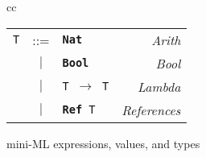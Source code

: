 \begin{figure}[t]
\begin{minipage}{\columnwidth}
\begin{tabular}{cc}
\begin{minipage}{.38\columnwidth}
{          \begin{tabular}{r@{~}c@{~}lr}
            {\tt T} & ::= & {\tt \bf Nat} & \textit{Arith}\\
            & $|$ &  {\tt \bf Bool} & \textit{Bool} \\
            & $|$ & {\tt T $\rightarrow$ T} & \textit{Lambda}\\
            & $|$ & {\tt {\bf Ref} T} & \textit{References}\\
          \end{tabular}
        }
      \end{minipage}
    \end{tabular}
  \end{minipage}
  \caption{mini-ML expressions, values, and types}
  \label{fig:MiniMLSyntax}
\end{figure}
